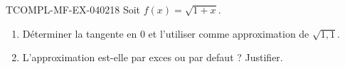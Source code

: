 \begin{exercice}{TCOMPL-MF-EX-040}{2}{18}
Soit $f(x) = \sqrt{1+x}$.
\begin{enumerate}
  \item Déterminer la tangente en $0$ et l'utiliser comme approximation de $\sqrt{1{,}1}$.
  \item L'approximation est-elle par exces ou par defaut ? Justifier.
\end{enumerate}

\end{exercice}
